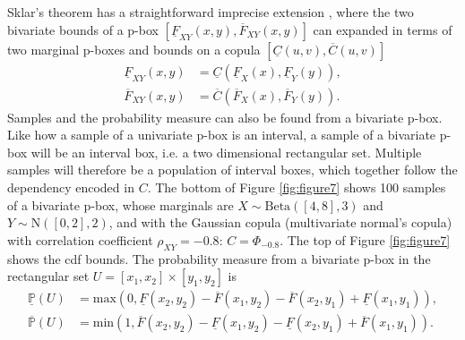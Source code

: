 \documentclass{juliacon}
\begin{document}
Sklar's theorem has a straightforward imprecise extension \cite{montes2015sklar}, where the two bivariate bounds of a p-box $[\underline{F}_{XY}(x,y), \overline{F}_{XY}(x,y)]$ can expanded in terms of two marginal p-boxes and bounds on a copula $[\underline{C}(u,v), \overline{C}(u,v)]$
\begin{align*}
  \underline{F}_{XY}(x,y) &= \underline{C}(\underline{F}_{X}(x), \underline{F}_{Y}(y)), \\ 
  \overline{F}_{XY}(x,y) &= \overline{C}(\overline{F}_{X}(x), \overline{F}_{Y}(y)).
\end{align*}
Samples and the probability measure can also be found from a bivariate p-box. Like how a sample of a univariate p-box is an interval, a sample of a bivariate p-box will be an interval box, i.e. a two dimensional rectangular set. Multiple samples will therefore be a population of interval boxes, which together follow the dependency encoded in $C$. The bottom of Figure \ref{fig:figure7} shows 100 samples of a bivariate p-box, whose marginals are $X \sim \text{Beta}([4,8], 3)$ and $Y \sim \text{N}([0,2], 2)$, and with the Gaussian copula (multivariate normal's copula) with correlation coefficient $\rho_{XY} = -0.8$: $C = \Phi_{-0.8}$. The top of Figure \ref{fig:figure7} shows the cdf bounds. The probability measure from a bivariate p-box in the rectangular set $ U = [x_{1}, x_{2}] \times [y_{1}, y_{2}]$ is
\begin{align*}
  \underline{\mathbb{P}}(U) &= \text{max}(0, \underline{F}(x_{2}, y_{2}) - \overline{F}(x_{1}, y_{2}) - \overline{F}(x_{2}, y_{1}) + \underline{F}(x_{1}, y_{1})) ,\\ 
  \overline{\mathbb{P}}(U)  &= \text{min}(1, \overline{F}(x_{2}, y_{2}) - \underline{F}(x_{1}, y_{2}) - \underline{F}(x_{2}, y_{1}) + \overline{F}(x_{1}, y_{1}) ).
\end{align*}
\end{document}
